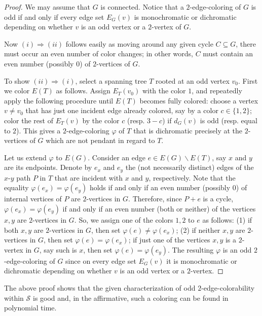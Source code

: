 \documentclass[a4paper,12pt]{article}
\numberwithin{equation}{section}
\begin{document}
\begin{proof}
We may assume that $G$ is connected. Notice that a $2$-edge-coloring of $G$ is odd if and only if every edge set $E_G(v)$ is monochromatic or dichromatic depending on whether $v$ is an odd vertex or a $2$-vertex of $G$.

Now $(i)\Rightarrow (ii)$ follows easily as moving around any given cycle $C\subseteq G$, there must occur an even number of color changes; in other words, $C$ must contain an even number (possibly $0$) of $2$-vertices of $G$.

To show $(ii)\Rightarrow (i)$, select a spanning tree $T$ rooted at an odd vertex $v_0$. First we color $E(T)$ as follows. Assign $E_T(v_0)$ with the color $1$, and repeatedly apply the following procedure until $E(T)$ becomes fully colored: choose a vertex $v\neq v_0$ that has just one incident edge already colored, say by a color $c\in\{1,2\}$; color the rest of $E_T(v)$ by the color $c$ (resp. $3-c$) if $d_G(v)$ is odd (resp. equal to $2$). This gives a $2$-edge-coloring $\varphi$ of $T$ that is dichromatic precisely at the $2$-vertices of $G$ which are not pendant in regard to $T$.

Let us extend $\varphi$ to $E(G)$. Consider an edge $e\in E(G)\backslash E(T)$, say $x$ and $y$ are its endpoints. Denote by $e_x$ and $e_y$ the (not necessarily distinct) edges of the $x$-$y$ path $P$ in $T$ that are incident with $x$ and $y$, respectively. Note that the equality $\varphi(e_x)=\varphi(e_y)$ holds if and only if an even number (possibly $0$) of internal vertices of $P$ are $2$-vertices in $G$. Therefore, since $P+e$ is a cycle, $\varphi(e_x)=\varphi(e_y)$ if and only if an even number (both or neither) of the vertices $x,y$ are $2$-vertices in $G$. So, we assign one of the colors $1,2$ to $e$ as follows: (1) if both $x,y$ are $2$-vertices in $G$, then set $\varphi(e)\neq \varphi(e_x)$; (2) if neither $x,y$ are $2$-vertices in $G$, then set $\varphi(e)=\varphi(e_x)$; if just one of the vertices $x,y$ is a $2$-vertex in $G$, say such is $x$, then set $\varphi(e)=\varphi(e_y)$. The resulting $\varphi$ is an odd $2$-edge-coloring of $G$ since on every edge set $E_G(v)$ it is monochromatic or dichromatic depending on whether $v$ is an odd vertex or a $2$-vertex.
\end{proof}

The above proof shows that the given characterization of odd $2$-edge-colorability within $\mathcal{S}$ is good and, in the affirmative, such a coloring can be found in polynomial time.
\end{document}
